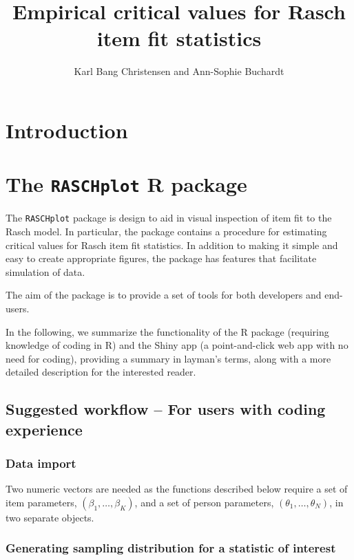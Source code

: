 \documentclass[11pt,a4paper]{article}
\title{Empirical critical values for Rasch item fit statistics}
\author{Karl Bang Christensen\affilnum{1} and Ann-Sophie Buchardt\affilnum{1}}
\affiliation{\affilnum{1}Section of Biostatistics, Department of Public Health, University of Copenhagen, Denmark}
\begin{document}
\listoftodos


\maketitle

\section{Introduction}


\section{The \texttt{RASCHplot} R package}

The \texttt{RASCHplot} package is design to aid in visual inspection of item fit to the Rasch model. In particular, the package contains a procedure for estimating critical values for Rasch item fit statistics. In addition to making it simple and easy to create appropriate figures, the package has features that facilitate simulation of data.

The aim of the package is to provide a set of tools for both developers and end-users. 

In the following, we summarize the functionality of the R package (requiring knowledge of coding in R) and the Shiny app (a point-and-click web app with no need for coding), providing a summary in layman's terms, along with a more detailed description for the interested reader.


\subsection{Suggested workflow -- For users with coding experience}


\subsubsection{Data import}

Two numeric vectors are needed as the functions described below require a set of item parameters, $(\beta_1,\ldots,\beta_K)$, and a set of person parameters, $(\theta_1,\ldots,\theta_N)$, in two separate objects.

\subsubsection{Generating sampling distribution for a statistic of interest}
\end{document}
